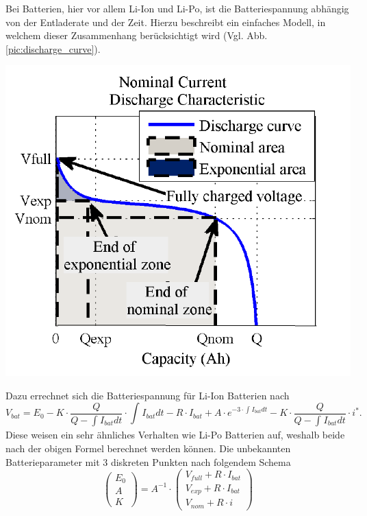 Bei Batterien, hier vor allem Li-Ion und Li-Po, ist die Batteriespannung abhängig von der Entladerate und der Zeit. Hierzu beschreibt \cite{Tremblay.2009} ein einfaches Modell, in welchem dieser Zusammenhang berücksichtigt wird (Vgl. Abb.\ref{pic:discharge_curve}). 
\begin{center}
	\includegraphics[scale=0.5]{images/Discharge.PNG}
	\label{pic:discharge_curve}
\end{center}
Dazu errechnet sich die Batteriespannung für Li-Ion Batterien nach
\begin{equation}
	V_{bat} = E_0-K\cdot\frac{Q}{Q-\int_{}^{} I_{bat} dt}\cdot\int_{}^{} I_{bat} dt - R\cdot I_{bat}+A\cdot e^{-3\cdot\int_{}^{} I_{bat} dt}-K\cdot\frac{Q}{Q-\int_{}^{} I_{bat} dt}\cdot i^* .
\end{equation}
Diese weisen ein sehr ähnliches Verhalten wie Li-Po Batterien auf, weshalb beide nach der obigen Formel berechnet werden können. Die unbekannten Batterieparameter mit 3 diskreten Punkten nach folgendem Schema
\begin{equation}
	\begin{pmatrix} E_0 \\ A \\ K \end{pmatrix} = A^{-1}\cdot \begin{pmatrix}
	V_{full}+R\cdot I_{bat} \\ V_{exp}+R\cdot I_{bat} \\ V_{nom}+R\cdot i \end{pmatrix}
\end{equation}
